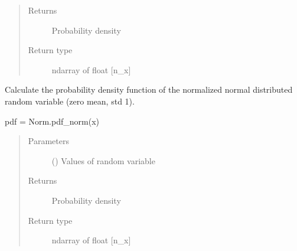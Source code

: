 \documentclass[letterpaper,10pt,english,openany,oneside]{sphinxmanual}
\begin{document}
\begin{fulllineitems}
\begin{fulllineitems}
\begin{quote}
\begin{description}
\item[{Returns}] \leavevmode
{} \textendash{} Probability density

\item[{Return type}] \leavevmode
ndarray of float {[}n\_x{]}

\end{description}\end{quote}

\end{fulllineitems}


\begin{fulllineitems}
\label{\detokenize{pygpc:pygpc.RandomParameter.Norm.pdf_norm}}
Calculate the probability density function of the normalized normal distributed random variable
(zero mean, std 1).

pdf = Norm.pdf\_norm(x)
\begin{quote}\begin{description}
\item[{Parameters}] \leavevmode
{} (\sphinxstyleliteralemphasis{\sphinxupquote{ {[}}}\sphinxstyleliteralemphasis{\sphinxupquote{{]}}}) \textendash{} Values of random variable

\item[{Returns}] \leavevmode
{} \textendash{} Probability density

\item[{Return type}] \leavevmode
ndarray of float {[}n\_x{]}

\end{description}\end{quote}

\end{fulllineitems}


\end{fulllineitems}

\end{document}
